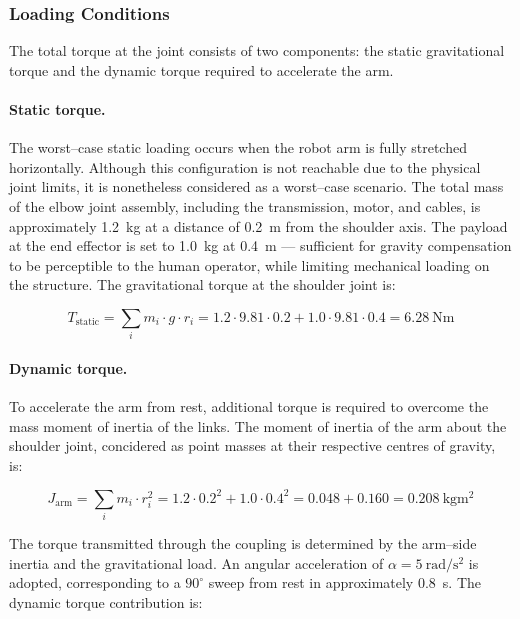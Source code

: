 \documentclass[11pt,a4paper,twoside,openright]{book}
\begin{document}
\subsubsection{Loading Conditions}
\label{subsec:loading_conditions}
 
The total torque at the joint consists of two components: the static gravitational torque and the dynamic torque required to accelerate the arm.
 
\paragraph{Static torque.}
The worst--case static loading occurs when the robot arm is fully stretched horizontally. Although this configuration is not reachable due to the physical joint limits, it is nonetheless considered as a worst--case scenario. The total mass of the elbow joint assembly, including the transmission, motor, and cables, is approximately \SI{1.2}{\kilogram} at a distance of \SI{0.2}{\metre} from the shoulder axis. The payload at the end effector is set to \SI{1.0}{\kilogram} at \SI{0.4}{\metre} --- sufficient for gravity compensation to be perceptible to the human operator, while limiting mechanical loading on the structure. The gravitational torque at the shoulder joint is:
 
\begin{equation}
    T_{\text{static}} = \sum_{i} m_i \cdot g \cdot r_i = 1.2 \cdot 9.81 \cdot 0.2 + 1.0 \cdot 9.81 \cdot 0.4 = \SI{6.28}{\newton\metre}
    \label{eq:static_torque}
\end{equation}
 
\paragraph{Dynamic torque.}
To accelerate the arm from rest, additional torque is required to overcome the mass moment of inertia of the links. The moment of inertia of the arm about the shoulder joint, concidered as point masses at their respective centres of gravity, is:
 
\begin{equation}
    J_{\text{arm}} = \sum_{i} m_i \cdot r_i^2 = 1.2 \cdot 0.2^2 + 1.0 \cdot 0.4^2 = 0.048 + 0.160 = \SI{0.208}{\kilogram\metre\squared}
    \label{eq:arm_inertia}
\end{equation}

The torque transmitted through the coupling is determined by the arm--side inertia and the gravitational load. An angular acceleration of $\alpha = \SI{5}{\radian\per\second\squared}$ is adopted, corresponding to a $90^\circ$ sweep from rest in approximately \SI{0.8}{\second}. The dynamic torque contribution is:
 
\end{document}
